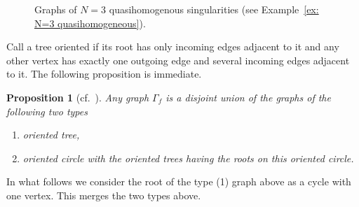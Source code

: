 \documentclass[10pt,a4paper]{amsart}
\numberwithin{equation}{section}
\newtheorem{Proposition}[Theorem]{Proposition}
 { \theoremstyle{definition}
\newtheorem{Definition}[Theorem]{Definition}
\newtheorem{Note}[Theorem]{Note}
\newtheorem{Example}[Theorem]{Example}
\newtheorem{Remark}[Theorem]{Remark} }
\begin{document}
\begin{figure}[t]
	\centering
{}
 \caption{Graphs of $N=3$ quasihomogenous singularities (see Example~\ref{ex: N=3 quasihomogeneous}).}
 \label{fig: N=3 graphs}
\end{figure}

Call a tree oriented if its root has only incoming edges adjacent to it and any other vertex has exactly one outgoing edge and several incoming edges adjacent to it.
The following proposition is immediate.~
\begin{Proposition}[{cf.\ \cite[Lemma 3.1]{HK}}]\label{prop: graph of f}
	Any graph $\Gamma_f$ is a disjoint union of the graphs of the following two types
	\begin{enumerate}\itemsep=0pt
	 \item[$(1)$] oriented tree,
	 \item[$(2)$] oriented circle with the oriented trees having the roots on this oriented circle.
	\end{enumerate}
\end{Proposition}

In what follows we consider the root of the type (1) graph above as a cycle with one vertex. This merges the two types above.
\end{document}
